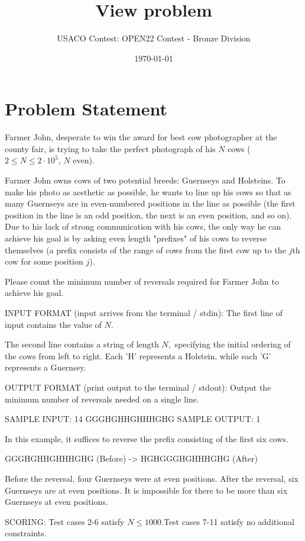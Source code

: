 \documentclass[12pt]{article}
\title{View problem}
\author{USACO Contest: OPEN22 Contest - Bronze Division}
\date{\today}
\begin{document}
\maketitle

\section*{Problem Statement}

Farmer John, desperate to win the award for best cow photographer at the county
fair, is trying to take the perfect photograph of his $N$ cows
($2 \leq N \leq 2\cdot 10^5$, $N$ even).

Farmer John owns cows of two potential breeds: Guernseys and Holsteins.  
To make his photo as aesthetic as possible, he wants to line up his 
cows so that as many Guernseys are in even-numbered positions in the line 
as possible (the first position in the line is an odd position, the next is
an even position, and so on). Due to his lack of strong
communication with his cows, the only way he can achieve his goal is by asking
even length "prefixes" of his cows to reverse themselves (a prefix 
consists of the range of cows from the first cow up to the $j$th cow
for some position $j$).

Please count the minimum number of reversals required for Farmer John to achieve
his goal.

INPUT FORMAT (input arrives from the terminal / stdin):
The first line of input contains the value of $N$.

The second line contains a string of length $N,$ specifying the initial ordering
of the cows from left to right. Each 'H' represents a Holstein, while each 'G'
represents a Guernsey. 

OUTPUT FORMAT (print output to the terminal / stdout):
Output the minimum number of reversals needed on a single line.

SAMPLE INPUT:
14
GGGHGHHGHHHGHG
SAMPLE OUTPUT: 
1

In this example, it suffices to reverse the prefix consisting of the first six
cows. 


   GGGHGHHGHHHGHG (Before)
-> HGHGGGHGHHHGHG (After)

Before the reversal, four Guernseys were at even positions. After the reversal,
six Guernseys are at even positions. It is impossible for there to be more than
six Guernseys at even positions.

SCORING:
Test cases 2-6 satisfy $N\le 1000$.Test cases 7-11 satisfy no additional constraints.
\end{document}
